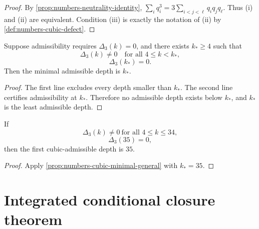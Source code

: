 \begin{proof}
By \cref{prop:numbers-neutrality-identity},
\(
  \sum_i q_i^3=3\sum_{i<j<\ell}q_iq_jq_\ell
\).
Thus (i) and (ii) are equivalent.
Condition (iii) is exactly the notation of (ii) by
\cref{def:numbers-cubic-defect}.
\end{proof}

\begin{proposition}
\label{prop:numbers-cubic-minimal-general}
Suppose admissibility requires
\(\Delta_3(k)=0\), and there exists \(k_\ast\ge4\) such that
\[
  \Delta_3(k)\neq0
  \quad\text{for all }4\le k<k_\ast,
\]
\[
  \Delta_3(k_\ast)=0.
\]
Then the minimal admissible depth is \(k_\ast\).
\end{proposition}

\begin{proof}
The first line excludes every depth smaller than \(k_\ast\).
The second line certifies admissibility at \(k_\ast\).
Therefore no admissible depth exists below \(k_\ast\), and \(k_\ast\)
is the least admissible depth.
\end{proof}

\begin{corollary}[Specialization to \(k_\tau=35\)]
\label{cor:numbers-k35-specialization}
If
\[
  \Delta_3(k)\neq0\ \text{for all }4\le k\le34,
\]
\[
  \Delta_3(35)=0,
\]
then the first cubic-admissible depth is \(35\).
\end{corollary}

\begin{proof}
Apply \cref{prop:numbers-cubic-minimal-general} with
\(k_\ast=35\).
\end{proof}

\section{Integrated conditional closure theorem}
\label{sec:numbers-integrated-closure}


